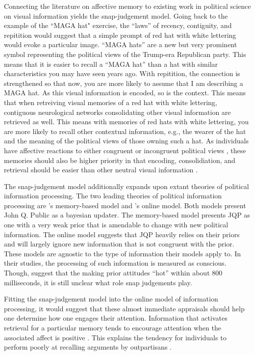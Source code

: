 \documentclass [12pt]{article}
\begin{document}
Connecting the literature on affective memory to existing work in political science on visual information yields the snap-judgement model. Going back to the example of the ``MAGA hat" exercise, the ``laws'' of recency, contiguity, and repitition \citep{kahana_et-al_2022_ohhum} would suggest that a simple prompt of red hat with white lettering would evoke a particular image. ``MAGA hats'' are a new but very prominent symbol representing the political views of the Trump-era Republican party. This means that it is easier to recall a ``MAGA hat'' than a hat with similar characteristics you may have seen years ago. With repitition, the connection is strengthened so that now, you are more likely to assume that I am describing a MAGA hat. As this visual information is encoded, so is the context. This means that when retreiving visual memories of a red hat with white lettering, contiguous neurological networks consolidating other visual information are retrieved as well. This means with memories of red hats with white lettering, you are more likely to recall other contextual information, e.g., the wearer of the hat and the meaning of the political views of those owning such a hat. As individuals have affective reactions to either congruent or incongruent political views \citep{iyengar_westwood_2015, druckman_levendusky_2019}, these memories should also be higher priority in that encoding, consolidiation, and retrieval should be easier than other neutral visual information \citep{kensinger_fields_2022_ohhum}. 

The snap-judgement model additionally expands upon extant theories of political information processing. The two leading theories of political information processing are \citeauthor{zaller_1992}'s \citeyearpar{zaller_1992} memory-based model and \citeauthor{taber_lodge_2006}'s \citeyearpar{taber_lodge_2006} online model. Both models present John Q. Public as a bayesian updater. The memory-based model presents JQP as one with a very weak prior that is amendable to change with new political information. The online model suggests that JQP heavily relies on their priors and will largely ignore new information that is not congruent with the prior. These models are agnostic to the type of information their models apply to. In their studies, the processing of such information is measured as conscious. Though, \citet{taber_lodge_2006} suggest that the making prior attitudes ``hot'' within about 800 milliseconds, it is still unclear what role snap judgements play. 

Fitting the snap-judgement model into the online model of information processing, it would suggest that these almost immediate appraisals should help one determine how one engages their attention. Information that activates retrieval for a particular memory tends to encourage attention when the associated affect is positive \citep{kensinger_fields_2022_ohhum}. This explains the tendency for individuals to perform poorly at recalling arguments by outpartisans \citep{lodge_et-al_1995}. 
\end{document}

